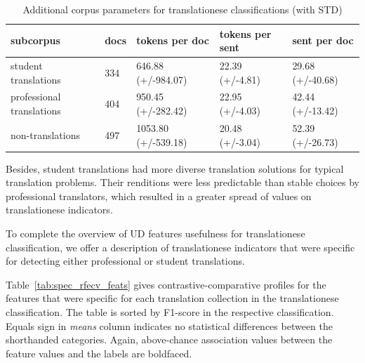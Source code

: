\begin{table}[H]
	\begin{tabular}{l|llll}
			\toprule
			subcorpus                 & docs & tokens per doc   & tokens per sent & sent per doc  \\
			\midrule
			student translations      & 334  & 646.88 (+/-984.07)  & 22.39 (+/-4.81)    & 29.68 (+/-40.68) \\
			professional translations & 404  & 950.45 (+/-282.42)  & 22.95 (+/-4.03)    & 42.44 (+/-13.42) \\
			non-translations          & 497  & 1053.80 (+/-539.18) & 20.48 (+/-3.04)    & 52.39 (+/-26.73) \\
			\bottomrule
		\end{tabular}
 \caption{\label{tab:corpus_means}Additional corpus parameters for translationese classifications (with STD)}
\end{table}
\vspace{-2em}
Besides, student translations had more diverse translation solutions for typical translation problems. Their renditions were less predictable than stable choices by professional translators, which resulted in a greater spread of values on translationese indicators. 



To complete the overview of UD features usefulness for translationese classification, we offer a description of translationese indicators that were specific for detecting either professional or student translations.  

Table~\ref{tab:spec_rfecv_feats} gives contrastive-comparative profiles for the features that were specific for each translation collection in the translationese classification. The table is sorted by F1-score in the respective classification. Equals sign in \textit{means} column indicates no statistical differences between the shorthanded categories. Again, above-chance association values between the feature values and the labels are boldfaced.

